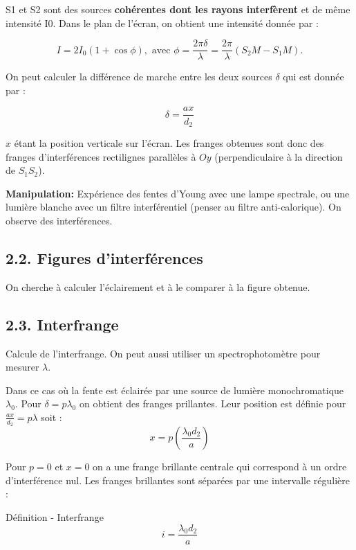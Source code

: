 \documentclass[french, a4paper, 10pt, twocolumn, landscape]{article}
\begin{document}
S1 et S2 sont des sources \textbf{cohérentes dont les rayons interfèrent} et de même intensité I0. Dans le plan de l'écran, on obtient une intensité donnée par : 

    \begin{equation}
	    I = 2I_0\left(1+\cos\phi\right), \text{ avec } \phi = \frac{2\pi\delta}{\lambda} = \frac{2\pi}{\lambda}\left(S_2M-S_1M\right). 
    \end{equation}


On peut calculer la différence de marche entre les deux sources $\delta$ qui est donnée par : 

\begin{equation}
	\delta = \frac{ax}{d_2}
\end{equation}

$x$ étant la position verticale sur l'écran. Les franges obtenues sont donc des franges d'interférences rectilignes parallèles à $Oy$ (perpendiculaire à la direction de $S_1S_2$).


\textbf{Manipulation:}\medskip
Expérience des fentes d'Young avec une lampe spectrale, ou une lumière blanche avec un filtre interférentiel (penser au filtre anti-calorique). On observe des interférences. 
\subsection*{2.2. Figures d'interférences}
On cherche à calculer l'éclairement et à le comparer à la figure obtenue.
\subsection*{2.3. Interfrange}
Calcule de l'interfrange. On peut aussi utiliser un spectrophotomètre pour mesurer $\lambda$.


Dans ce cas où la fente est éclairée par une source de lumière monochromatique $\lambda_0$. Pour $\delta = p\lambda_0$ on obtient des franges prillantes. Leur position est définie pour $\frac{ax}{d_2}=p\lambda$ soit : 
$$x = p\left(\frac{\lambda_0d_2}{a}\right)$$

Pour $p=0$ et $x=0$ on a une frange brillante centrale qui correspond à un ordre d'interférence nul. Les franges brillantes sont séparées par une intervalle régulière : 
\begin{definition}{Définition - Interfrange}
\begin{equation}
	i = \frac{\lambda_0d_2}{a}
\end{equation}
\end{definition}
\end{document}
